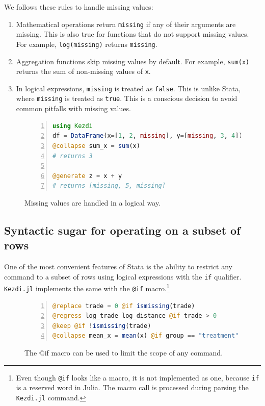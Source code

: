 \documentclass{juliacon}
\begin{document}
We follows these rules to handle missing values:
\begin{enumerate}
\item Mathematical operations return \texttt{missing} if any of their arguments are missing. This is also true for functions that do not support missing values. For example, \texttt{log(missing)} returns \texttt{missing}.
\item Aggregation functions skip missing values by default. For example, \texttt{sum(x)} returns the sum of non-missing values of \texttt{x}.
\item In logical expressions, \texttt{missing} is treated as \texttt{false}. This is unlike Stata, where \texttt{missing} is treated as \texttt{true}. This is a conscious decision to avoid common pitfalls with missing values.
\end{enumerate}

\begin{figure}[h!]
\begin{lstlisting}[language = Julia, numbers=left, numberstyle=\tiny\color{gray}]
using Kezdi
df = DataFrame(x=[1, 2, missing], y=[missing, 3, 4])
@collapse sum_x = sum(x)
# returns 3

@generate z = x + y
# returns [missing, 5, missing]
\end{lstlisting}
	
\caption{Missing values are handled in a logical way.}
\label{fig:missing}
\end{figure}

\subsection{Syntactic sugar for operating on a subset of rows}

One of the most convenient features of Stata is the ability to restrict any command to a subset of rows using logical expressions with the \texttt{if} qualifier. \texttt{Kezdi.jl} implements the same with the \texttt{@if} macro.\footnote{Even though \texttt{@if} looks like a macro, it is not implemented as one, because \texttt{if} is a reserved word in Julia. The macro call is processed during parsing the \texttt{Kezdi.jl} command.} 

\begin{figure}[h!]
\begin{lstlisting}[language = Julia, numbers=left, numberstyle=\tiny\color{gray}]
@replace trade = 0 @if ismissing(trade)
@regress log_trade log_distance @if trade > 0
@keep @if !ismissing(trade) 
@collapse mean_x = mean(x) @if group == "treatment"		
\end{lstlisting}
\caption{The @if macro can be used to limit the scope of any command.}
\label{fig:ifmacro}
\end{figure}
\end{document}
